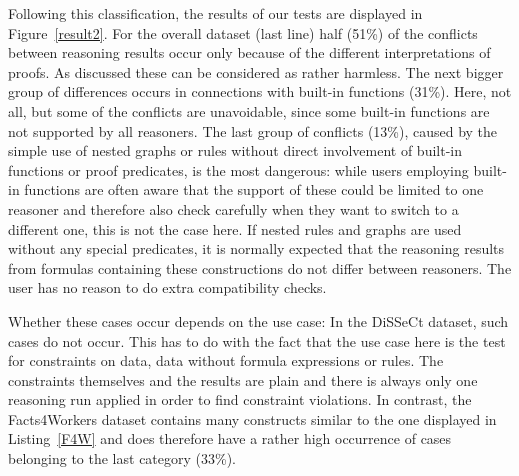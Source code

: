 Following this classification, the results of our tests are displayed in Figure~\ref{result2}.
For the overall dataset (last line) half (51\%) of the conflicts between reasoning results occur only because of the different interpretations of proofs. 
As discussed these can be considered as rather harmless. %
The next bigger group of differences occurs in connections with built-in functions (31\%). 
Here, not all, but some of the conflicts are unavoidable,
since some built-in functions are not supported by all reasoners. The last group of conflicts (13\%), caused by the simple use of nested graphs or rules 
without direct involvement of built-in functions or proof predicates,  is the most dangerous: while users employing built-in functions are often
aware that the support of these could be limited to one reasoner and therefore also check carefully when they want to switch to a different one, 
this is not the case here. If nested rules and graphs are used without
any special predicates, it is normally expected that the reasoning results from formulas containing these constructions do not differ between reasoners. 
The user  has no reason to do extra compatibility checks.

Whether these cases occur depends on the use case: 
In the DiSSeCt dataset, such cases do not occur. This has to do with the fact that the use case here is the test for constraints on \rdf data, \ie data 
without formula expressions 
or rules. 
The constraints themselves and the results
are plain \rdf and there is always only one reasoning run applied in order to find constraint violations. In contrast, the Facts4Workers dataset contains
many constructs similar to the one displayed in Listing~\ref{F4W} and does therefore have a rather high occurrence of cases belonging to the last category (33\%).


